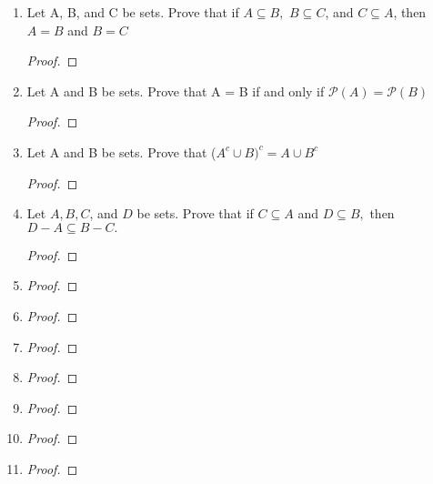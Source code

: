 \documentclass[11pt]{article}
\begin{document}
\begin{enumerate}
    \item Let A, B, and C be sets. Prove that if $A \subseteq B,$ $B \subseteq C$, and $C \subseteq A$, then $A = B$ and $B = C$
        \begin{proof}
        \end{proof}
        
    \item Let A and B be sets. Prove that A = B if and only if $\mathscr{P}(A) = \mathscr{P}(B)$
        \begin{proof}
        \end{proof}
        
    \item Let A and B be sets. Prove that ($A^c \cup B)^c = A \cup B^c$
        \begin{proof}
        \end{proof}
        
    \item Let $A,B,C$, and $D$ be sets. Prove that if $C \subseteq A$ and $D \subseteq B,$ then $D-A\subseteq B-C.$
        \begin{proof}
        \end{proof}
        
    \item
        \begin{proof}
        \end{proof}
        
    \item
        \begin{proof}
        \end{proof}
        
    \item
        \begin{proof}
        \end{proof}
        
    \item
        \begin{proof}
        \end{proof}
        
    \item
        \begin{proof}
        \end{proof}
        
    \item
        \begin{proof}
        \end{proof}
        
    \item
        \begin{proof}
        \end{proof}
        

\end{enumerate}
\end{document}
